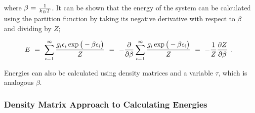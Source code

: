 \documentclass[11pt]{article}
\begin{document}
where \begin{math} \beta \hspace{0.025cm} = \hspace{0.025cm} \frac{1}{k_B T} \end{math}. It can be shown that the energy of the system can be calculated using the partition function by taking its negative derivative with respect to \begin{math} \beta \end{math} and dividing by \begin{math} Z \end{math};

\begin{equation} \label{wr-eq-33-1}
E \hspace{0.125cm} = \hspace{0.125cm} \sum_{i = 1}^{\infty} \frac{g_i \epsilon_{i} \exp \big(- \beta \epsilon_i \big)}{Z} \hspace{0.125cm} = \hspace{0.125cm} - \frac{\partial}{\partial{\beta}}\sum_{i = 1}^{\infty} \frac{g_i \exp \big(- \beta \epsilon_i \big)}{Z} \hspace{0.125cm} = \hspace{0.125cm} - \frac{1}{Z} \frac{\partial Z}{\partial{\beta}}   \hspace{0.125cm} .
\end{equation}

Energies can also be calculated using density matrices and a variable \begin{math} \tau \end{math}, which is analogous \begin{math} \beta \end{math}.

\subsubsection{Density Matrix Approach to Calculating Energies}
\end{document}
